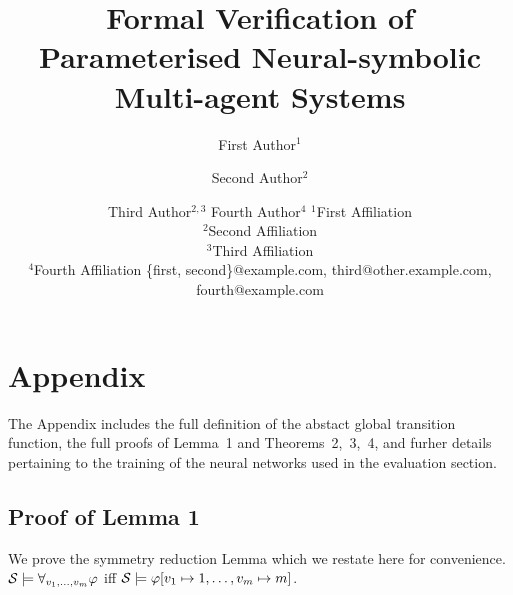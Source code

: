 \documentclass{article}
\title{Formal Verification of  Parameterised Neural-symbolic Multi-agent Systems}
\author{
}
\author{
First Author$^1$
\and
Second Author$^2$\and
Third Author$^{2,3}$\And
Fourth Author$^4$
\affiliations
$^1$First Affiliation\\
$^2$Second Affiliation\\
$^3$Third Affiliation\\
$^4$Fourth Affiliation
\emails
\{first, second\}@example.com,
third@other.example.com,
fourth@example.com
}
\newenvironment{customlemma}[1]
  {\renewcommand\theinnercustomlemma{#1}\innercustomlemma}
  {\endinnercustomlemma}
\begin{document}
\maketitle


\section*{Appendix}

The Appendix includes the full definition of the abstact global transition
function, the full proofs of Lemma~1 and Theorems~2,~3,~4, and furher details
pertaining to the training of the neural networks used in the evaluation
section.

\subsection*{Proof of Lemma 1} 
We prove the symmetry reduction Lemma which we restate here for convenience.
\begin{customlemma}{1}
$\mathcal S \models \forall_{v_1,\ldots,v_m} \varphi$ iff $\mathcal S \models \varphi[v_1 \mapsto 1, \ldots, v_m
\mapsto m]$.
\end{customlemma}
\end{document}
